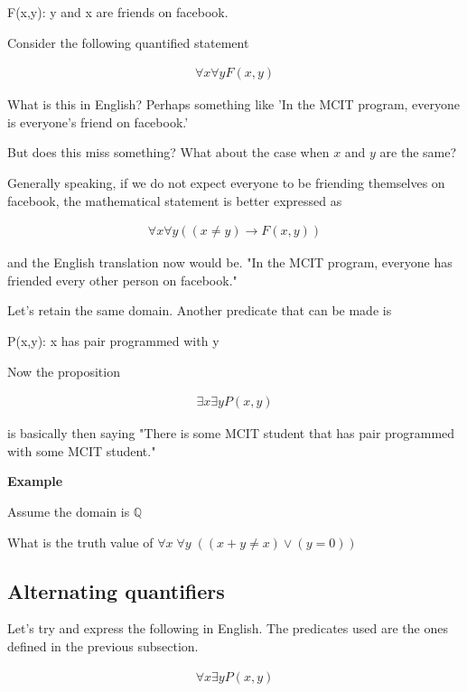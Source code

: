 \documentclass[12pt]{article}
\begin{document}
F(x,y): y and x are friends on facebook.

Consider the following quantified statement

\begin{align*}
\forall x \forall y F(x,y)
\end{align*}

What is this in English? Perhaps something like 'In the MCIT program, everyone is everyone's friend on facebook.'

But does this miss something? What about the case when $x$ and $y$ are the same?

Generally speaking, if we do not expect everyone to be friending themselves on facebook, the mathematical statement is better expressed as

\begin{align*}
\forall x \forall y ( (x \neq y) \rightarrow F(x,y))
\end{align*} 

and the English translation now would be. "In the MCIT program, everyone has friended every other person on facebook."

Let's retain the same domain. Another predicate that can be made is

P(x,y): x has pair programmed with y

Now the proposition 

\begin{align*}
\exists x \exists y P(x,y)
\end{align*}

is basically then saying "There is some MCIT student that has pair programmed with some MCIT student."

\medskip

\textbf{Example}

Assume the domain is $\mathbb{Q}$

What is the truth value of $\forall x \; \forall y \; (( x + y \neq x) \vee (y = 0))$

\subsection*{Alternating quantifiers}

Let's try and express the following in English. The predicates used are the ones defined in the previous subsection.

\begin{align*}
\forall x \exists y P(x,y)
\end{align*}
\end{document}
